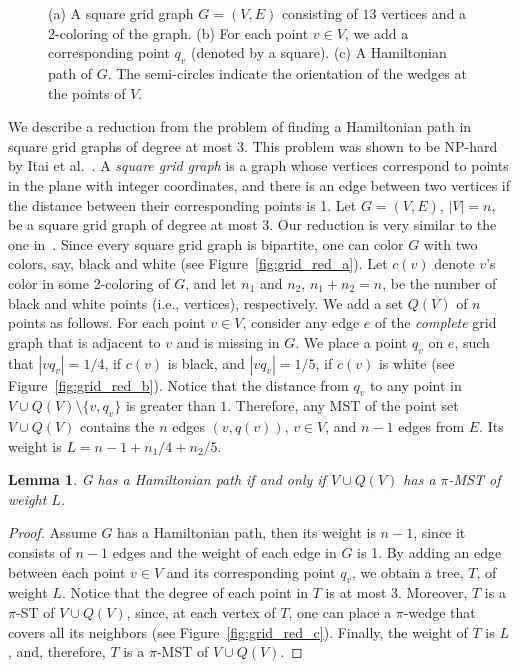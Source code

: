 \documentclass[11pt]{article}
\newtheorem{lemma}[theorem]{Lemma}
\begin{document}
{\begin{figure}[htb]
\centering
  \hspace{.75cm}
  \hspace{.75cm}
 	\caption{(a) A square grid graph $G=(V,E)$ consisting of $13$ vertices and a 2-coloring of the graph. (b) For each point $v \in V$, we add a corresponding point $q_v$ (denoted by a square). (c) A Hamiltonian path of $G$. The semi-circles indicate the orientation of the wedges at the points of $V$.}
 	\label{fig:reduction180}	
\end{figure} 

We describe a reduction from the problem of finding a Hamiltonian path in square grid graphs of degree at most 3. This problem was shown to be NP-hard by Itai et al.~\cite{IPS82}.
A {\em square grid graph} is a graph whose vertices correspond to points in the plane with integer coordinates, and there is an edge between two vertices if the distance between their corresponding points is 1. 
Let $G=(V,E)$, $|V|=n$, be a square grid graph of degree at most 3. Our reduction is very similar to the one in~\cite{PV84}. Since every square grid graph is bipartite, one can color $G$ with two colors, say, black and white (see Figure~\ref{fig:grid_red_a}). Let $c(v)$ denote $v$'s color in some 2-coloring of $G$, and let $n_1$ and $n_2$, $n_1+n_2=n$, be the number of black and white points (i.e., vertices), respectively. 
We add a set $Q(V)$ of $n$ points as follows. For each point $v \in V$, consider any edge $e$ of the {\em complete} grid graph that is adjacent to $v$ and is missing in $G$. We place a point $q_v$ on $e$, such that $|vq_v|=1/4$, if $c(v)$ is black, and $|vq_v|=1/5$, if $c(v)$ is white (see Figure~\ref{fig:grid_red_b}). Notice that the distance from $q_v$ to any point in $V \cup Q(V) \setminus \{v,q_v\}$ is greater than $1$. 
Therefore, any MST of the point set $V \cup Q(V)$ contains the $n$ edges $(v,q(v))$, $v \in V$, and $n-1$ edges from $E$. Its weight is $L = n-1 + n_1/4 + n_2/5$.


\begin{lemma}
\label{lem:hardness1}
G has a Hamiltonian path if and only if $V \cup Q(V)$ has a $\pi$-MST of weight $L$. 
\end{lemma}
\begin{proof}
Assume $G$ has a Hamiltonian path, then its weight is $n-1$, since it consists of $n-1$ edges and the weight of each edge in $G$ is 1.
By adding an edge between each point $v \in V$ and its corresponding point $q_v$, we obtain a tree, $T$, of weight $L$. Notice that the degree of each point in $T$ is at most 3. Moreover, $T$ is a $\pi$-ST of $V \cup Q(V)$, since, at each vertex of $T$, one can place a $\pi$-wedge that covers all its neighbors (see Figure~\ref{fig:grid_red_c}). Finally, the weight of $T$ is $L$, and, therefore, $T$ is a $\pi$-MST of $V \cup Q(V)$.


\end{proof}}
\end{document}
